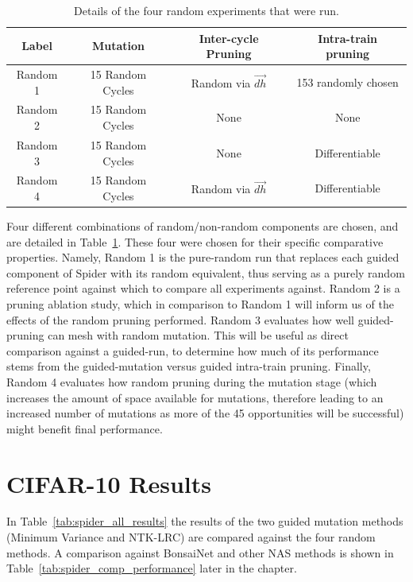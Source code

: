 \begin{table}[ht!]
\begin{center}
\begin{tabular}{c|ccc}
    Label    & Mutation          & Inter-cycle Pruning       & Intra-train pruning \\ \hline
    Random 1 & 15 Random Cycles &  Random via $\vec{dh}$    & 153 randomly chosen \\
    Random 2 & 15 Random Cycles &  None                     & None \\
    Random 3 & 15 Random Cycles &  None                     & Differentiable \\
    Random 4 & 15 Random Cycles &  Random via $\vec{dh}$    & Differentiable \\
\end{tabular}
\end{center}
\caption[Details of the four random experiments that were run]{Details of the four random experiments that were run.}
\label{tab:spider_randoms}
\end{table}

Four different combinations of random/non-random components are chosen, and are detailed in Table~\ref{tab:spider_randoms}.
These four were chosen for their specific comparative properties. Namely, Random 1 is the pure-random run that replaces each guided component of Spider with its random equivalent, thus
serving as a purely random reference point against which to compare all experiments against. Random 2 is a pruning ablation
study, which in comparison to Random 1 will inform us of the effects of the random pruning performed. Random 3 evaluates how
well guided-pruning can mesh with random mutation. This will be useful as direct comparison against a guided-run, to determine
how much of its performance stems from the guided-mutation versus guided intra-train pruning. Finally, Random 4 evaluates how
random pruning during the mutation stage (which increases the amount of space available for mutations, therefore
leading to an increased number of mutations as more of the 45 opportunities will be successful) might benefit final
performance.


\section{CIFAR-10 Results}\label{sect:spider_results}
In Table~\ref{tab:spider_all_results} the results of the two guided mutation methods (Minimum Variance and NTK-LRC)
are compared against the four random methods. A comparison against BonsaiNet and other NAS methods is shown in Table~\ref{tab:spider_comp_performance}
later in the chapter.

